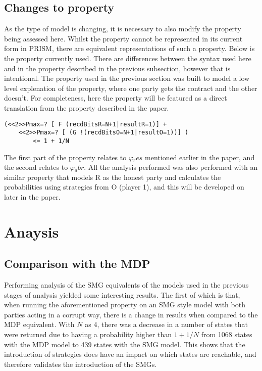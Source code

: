 \documentclass{l4proj}
\begin{document}
\subsection{Changes to property}

As the type of model is changing, it is necessary to also modify the property being assessed here. Whilst the property cannot be represented in its current form in PRISM, there are equivalent representations of such a property. Below is the property currently used. There are differences between the syntax used here and in the property described in the previous subsection, however that is intentional. The property used in the previous section was built to model a low level explenation of the property, where one party gets the contract and the other doesn't. For completeness, here the property will be featured as a direct translation from the property described in the paper. 

\begin{lstlisting}
(<<2>>Pmax=? [ F (recdBitsR=N+1|resultR=1)] + 
    <<2>>Pmax=? [ (G !(recdBitsO=N+1|resultO=1))] ) 
        <= 1 + 1/N
\end{lstlisting}

The first part of the property relates to $\varphi{_res}$ mentioned earlier in the paper, and the second relates to $\varphi{_abr}$. All the analysis performed was also performed with an similar property that models R as the honest party and calculates the probabilities using strategies from O (player 1), and this will be developed on later in the paper. 

\section{Anaysis}

\subsection{Comparison with the MDP}
Performing analysis of the SMG equivalents of the models used in the previous stages of analysis yielded some interesting results. The first of which is that, when running the aforementioned property on an SMG style model with both parties acting in a corrupt way, there is a change in results when compared to the MDP equivalent. With $N$ as 4, there was a decrease in a number of states that were returned due to having a probability higher than $1+1/N$ from 1068 states with the MDP model to 439 states with the SMG model. This shows that the introduction of strategies does have an impact on which states are reachable, and therefore validates the introduction of the SMGs.
\end{document}
